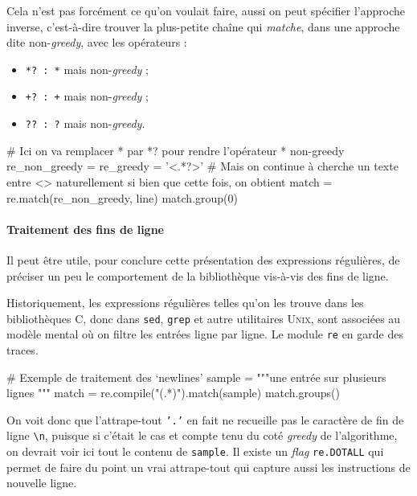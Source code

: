 Cela n'est pas forcément ce qu'on voulait faire, aussi on peut spécifier l'approche inverse, c'est-à-dire trouver la plus-petite chaîne qui \textit{matche}, dans une approche dite non-\textit{greedy}, avec les opérateurs :
\begin{itemize}\jazzitem
\item \texttt{*? : *} mais non-\textit{greedy} ;
\item \texttt{+? : +} mais non-\textit{greedy} ;
\item \texttt{?? : ?} mais non-\textit{greedy}.
\end{itemize}

\begin{idleconsole*}
	\begin{pyconsole}
# Ici on va remplacer * par *? pour rendre l'opérateur * non-greedy
re_non_greedy = re_greedy = '<.*?>'
# Mais on continue à cherche un texte entre <> naturellement si bien que cette fois, on obtient
match = re.match(re_non_greedy, line)
match.group(0)
	\end{pyconsole}
\end{idleconsole*}

\vspace{-1pt}

\paragraph{Traitement des fins de ligne}
Il peut être utile, pour con\-clure cette présentation des expressions régulières, de préciser un peu le comportement de la bibliothèque vis-à-vis des fins de ligne.

Historiquement, les expressions régulières telles qu'on les trouve dans les bibliothèques C, donc dans \texttt{sed}, \texttt{grep} et autre utilitaires \textsc{Unix}, sont associées au modèle mental où on filtre les entrées ligne par ligne.
Le module \texttt{re} en garde des traces.

\begin{idleconsole}
	\begin{pyconsole}
# Exemple de traitement des `newlines'
sample = """une entrée 
sur
plusieurs
lignes
"""
match = re.compile("(.*)").match(sample)
match.groups()
\end{pyconsole}
\end{idleconsole}

On voit donc que l'attrape-tout \texttt{'.'} en fait ne recueille pas le caractère de fin de ligne \texttt{\textbackslash{n}}, puisque si c'était le cas et compte tenu du coté \textit{greedy} de l'algorithme, on devrait voir ici tout le contenu de \texttt{sample}. Il existe un \textit{flag} \texttt{re.DOTALL} qui permet de faire du point un vrai attrape-tout qui capture aussi les instructions de nouvelle ligne.

